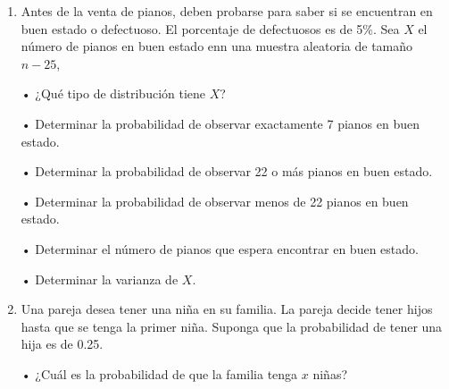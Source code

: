 \documentclass[a4paper, 12pt]{article}
\newcommand{\Pspace}{0.5cm}
\newcommand{\Aspace}{0.2cm}
\begin{document}
\begin{enumerate}
    \item Antes de la venta de pianos, deben probarse para saber si se encuentran en buen estado o defectuoso. El porcentaje de defectuosos es de 5\%. Sea $X$ el número de pianos en buen estado enn una muestra aleatoria de tamaño $n - 25$,
    \vspace{\Aspace} \par
    • ¿Qué tipo de distribución tiene $X$?
    \\ { \color{azul}  }

    \vspace{\Aspace} \par
    • Determinar la probabilidad de observar exactamente 7 pianos en buen estado.
    \\ { \color{azul}  }

    \vspace{\Aspace} \par
    • Determinar la probabilidad de observar 22 o más pianos en buen estado.
    \\ { \color{azul}  }

    \vspace{\Aspace} \par
    • Determinar la probabilidad de observar menos de 22 pianos en buen estado.
    \\ { \color{azul}  }

    \vspace{\Aspace} \par
    • Determinar el número de pianos que espera encontrar en buen estado.
    \\ { \color{azul}  }

    \vspace{\Aspace} \par
    • Determinar la varianza de $X$.
    \\ { \color{azul}  }


    \vspace{\Pspace}
    \item Una pareja desea tener una niña en su familia. La pareja decide tener hijos hasta que se tenga la primer niña. Suponga que la probabilidad de tener una hija es de 0.25. 
    \vspace{\Aspace} \par
    • ¿Cuál es la probabilidad de que la familia tenga $x$ niñas?
    \\ { \color{azul}  }


\end{enumerate}
\end{document}
